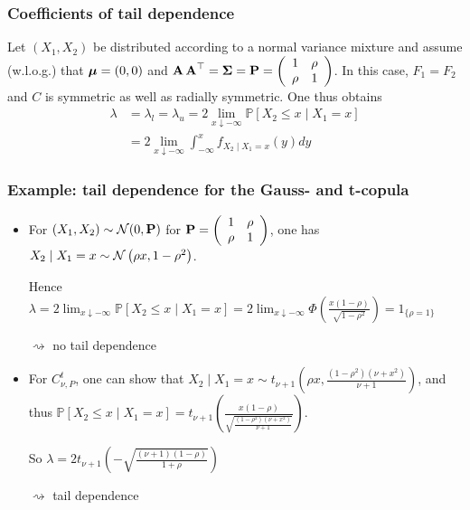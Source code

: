 \subsubsection*{Coefficients of tail dependence}
Let $\left(X_{1}, X_{2}\right)$ be distributed according to a normal variance mixture and assume (w.l.o.g.) that $\operatorname{\boldsymbol{\mathbf{\mu}}}=(0,0)$ and $\operatorname{\boldsymbol{\mathbf{A}}} \operatorname{\boldsymbol{\mathbf{A}}}^{\operatorname{\top}}=\operatorname{\boldsymbol{\mathbf{\Sigma}}}=\boldsymbol{\mathbf{P}}=\left(\begin{array}{cc}1 & \rho \\ \rho & 1\end{array}\right)$. In this case, $F_{1}=F_{2}$ and $C$ is symmetric as well as radially symmetric. One thus obtains
$$
\begin{aligned}
\lambda&=\lambda_{l}=\lambda_{u}=2 \lim _{x \downarrow-\infty} \mathbb{P}\left[X_{2} \leq x \mid X_{1}=x\right]\\
&=2 \lim _{x \downarrow-\infty} \int_{-\infty}^{x} f_{X_{2} \mid X_{1}=x}(y) d y
\end{aligned}
$$



\subsubsection*{Example: tail dependence for the Gauss- and t-copula}
\begin{itemize}[leftmargin=*]
    \item For $\left(X_{1}, X_{2}\right) \sim \operatorname{\mathcal{N}}(0, \boldsymbol{\mathbf{P}})$ for $\boldsymbol{\mathbf{P}}=\left(\begin{array}{cc}1 & \rho \\ \rho & 1\end{array}\right)$, one has $X_{2} \mid X_{1}=x \sim \operatorname{\mathcal{N}}\left(\rho x, 1-\rho^{2}\right)$.

Hence
$\lambda=2 \lim _{x \downarrow-\infty} \mathbb{P}\left[X_{2} \leq x \mid X_{1}=x\right]=2 \lim _{x \downarrow-\infty} \Phi\left(\frac{x(1-\rho)}{\sqrt{1-\rho^{2}}}\right)=1_{\{\rho=1\}}$ 

$\rightsquigarrow$ no tail dependence
    \item For $C_{\nu, P}^{t}$, one can show that $X_{2} \mid X_{1}=x \sim t_{\nu+1}\left(\rho x, \frac{\left(1-\rho^{2}\right)\left(\nu+x^{2}\right)}{\nu+1}\right)$, and thus
$\mathbb{P}\left[X_{2} \leq x \mid X_{1}=x\right]=t_{\nu+1}\left(\frac{x(1-\rho)}{\sqrt{\frac{\left(1-\rho^{2}\right)\left(\nu+x^{2}\right)}{\nu+1}}}\right)$. 

So $\lambda=2 t_{\nu+1}\left(-\sqrt{\frac{(\nu+1)(1-\rho)}{1+\rho}}\right)$

$\rightsquigarrow$ tail dependence
\end{itemize}






